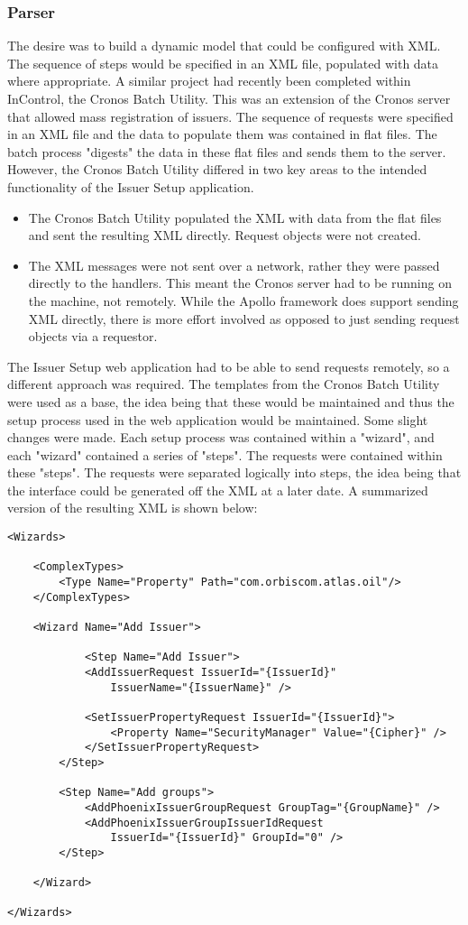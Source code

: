 \documentclass[a4paper, 11pt, titlepage]{article}
\begin{document}
\subsubsection{Parser} 
The desire was to build a dynamic model that could be configured with XML. The sequence of steps would be specified in an XML file, populated with data where appropriate. A similar project had recently been completed within InControl, the Cronos Batch Utility. This was an extension of the Cronos server that allowed mass registration of issuers. The sequence of requests were specified in an XML file and the data to populate them was contained in flat files. The batch process "digests" the data in these flat files and sends them to the server. However, the Cronos Batch Utility differed in two key areas to the intended functionality of the Issuer Setup application. 
\begin{itemize} 
\item The Cronos Batch Utility populated the XML with data from the flat files and sent the resulting XML directly. Request objects were not created. 
\item The XML messages were not sent over a network, rather they were passed directly to the handlers. This meant the Cronos server had to be running on the machine, not remotely. While the Apollo framework does support sending XML directly, there is more effort involved as opposed to just sending request objects via a requestor.  
\end{itemize} 
The Issuer Setup web application had to be able to send requests remotely, so a different approach was required. The templates from the Cronos Batch Utility were used as a base, the idea being that these would be maintained and thus the setup process used in the web application would be maintained. Some slight changes were made. Each setup process was contained within a "wizard", and each "wizard" contained a series of "steps". The requests were contained within these "steps". The requests were separated logically into steps, the idea being that the interface could be generated off the XML at a later date. A summarized version of the resulting XML is shown below: 
\begin{verbatim} 
<Wizards> 
 
    <ComplexTypes> 
        <Type Name="Property" Path="com.orbiscom.atlas.oil"/> 
    </ComplexTypes> 
 
    <Wizard Name="Add Issuer"> 
 
            <Step Name="Add Issuer"> 
            <AddIssuerRequest IssuerId="{IssuerId}"
                IssuerName="{IssuerName}" /> 
 
            <SetIssuerPropertyRequest IssuerId="{IssuerId}"> 
                <Property Name="SecurityManager" Value="{Cipher}" /> 
            </SetIssuerPropertyRequest> 
        </Step> 
		 
        <Step Name="Add groups"> 
            <AddPhoenixIssuerGroupRequest GroupTag="{GroupName}" /> 
            <AddPhoenixIssuerGroupIssuerIdRequest 
                IssuerId="{IssuerId}" GroupId="0" />	 
        </Step> 
	 
    </Wizard> 
 
</Wizards> 
\end{verbatim} 
 
\end{document}
